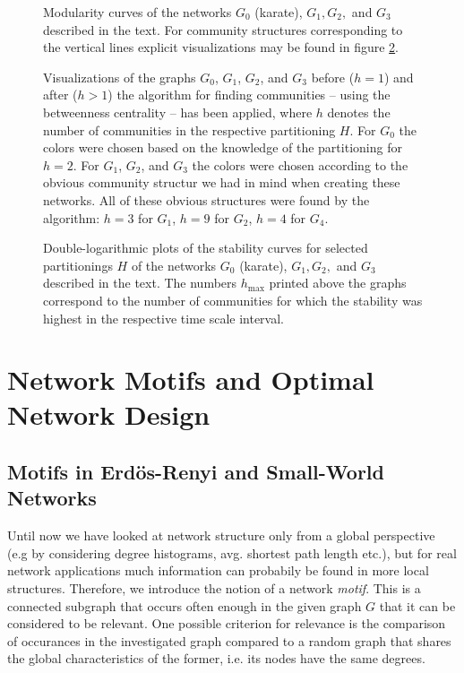 \documentclass{scrartcl}
\begin{document}
\begin{figure}[bcht]
    \centering
    \caption{Modularity curves of the networks $G_0$ (karate), $G_1, G_2,$
        and $G_3$ described in the text. For community structures
        corresponding to the vertical lines explicit visualizations may be
        found in figure \ref{fig:12_gr}.}
    \label{fig:12_mod}
\end{figure}


\begin{figure}
    \centering
    \def\svgwidth{0.8\textwidth}
    
    \caption{Visualizations of the graphs $G_0$, $G_1$, $G_2$, and $G_3$
    before ($h = 1$) and after ($h > 1$) the algorithm for finding
    communities -- using the betweenness centrality -- has been applied,
    where $h$ denotes the number of communities in the respective
    partitioning $H$. For $G_0$ the colors were chosen based on the
    knowledge of the partitioning for $h=2$.  For $G_1$, $G_2$, and $G_3$
    the colors were chosen according to the obvious community
    structur we had in mind when creating these networks. All of these
    obvious structures were found by the algorithm: $h = 3$ for $G_1$,
    $h=9$ for $G_2$, $h=4$ for $G_4$.}
    \label{fig:12_gr}
\end{figure}


\begin{figure}
    \centering
    \caption{Double-logarithmic plots of the stability curves for selected
    partitionings $H$ of the networks $G_0$ (karate), $G_1, G_2,$ and
    $G_3$ described in the text. The numbers $h_\mathrm{max}$ printed above
    the graphs correspond to the number of communities for which the
    stability was highest in the respective time scale interval.}
    \label{fig:13}
\end{figure}

\clearpage

\section{Network Motifs and Optimal Network Design}
\subsection{Motifs in Erdös-Renyi and Small-World Networks}
Until now we have looked at network structure only from a global
perspective (e.g by considering degree histograms, avg. shortest path
length etc.), but for real network applications much information can
probabily be found in more local structures. Therefore, we introduce the
notion of a network \emph{motif}. This is a connected subgraph that occurs often
enough in the given graph $G$ that it can be considered to be relevant.
One possible criterion for relevance is the comparison of occurances in the
investigated graph compared to a random graph that shares the global 
characteristics of the former, i.e. its nodes have the same degrees.
\end{document}
